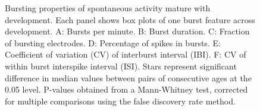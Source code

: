 \documentclass{article}
\begin{document}
\begin{figure}
  \centering
  \caption{Bursting properties of spontaneous activity mature with
    development.  Each panel shows box plots of one burst feature
    across development. A: Bursts
    per minute. B: Burst duration. C: Fraction of bursting electrodes. D: Percentage of spikes in
    bursts.  E: Coefficient of variation (CV) of interburst interval
    (IBI).  F: CV of within burst interspike interval (ISI). Stars represent significant difference in median values between pairs of consecutive ages at the 0.05 level. P-values obtained from a Mann-Whitney test, corrected for multiple comparisons using the false discovery rate method.}
\end{figure}
\end{document}
